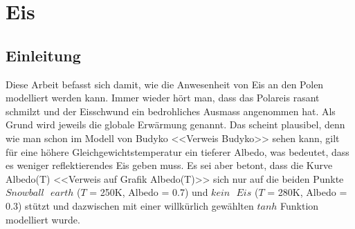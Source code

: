 %
%
%
\chapter{Eis\label{chapter:eis}}
\begin{refsection}

\section{Einleitung}
Diese Arbeit befasst sich damit, wie die Anwesenheit von Eis an den Polen modelliert werden kann. Immer wieder hört man, dass das Polareis rasant schmilzt und der Eisschwund ein bedrohliches Ausmass angenommen hat. Als Grund wird jeweils die globale Erwärmung genannt. Das scheint plausibel, denn wie man schon im Modell von Budyko <<Verweis Budyko>> sehen kann, gilt für eine höhere Gleichgewichtstemperatur ein tieferer Albedo, was bedeutet, dass es weniger reflektierendes Eis geben muss. Es sei aber betont, dass die Kurve Albedo(T) <<Verweis auf Grafik Albedo(T)>> sich nur auf die beiden Punkte $Snowball\text{ }earth$ ($T$ = 250K, Albedo = 0.7) und $kein\text{ }Eis$ ($T$ = 280K, Albedo = 0.3) stützt und dazwischen mit einer willkürlich gewählten $tanh$ Funktion modelliert wurde. 

\end{refsection}
